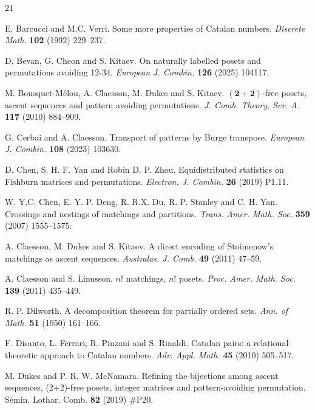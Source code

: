\documentclass[11pt]{article}
\begin{document}
	\begin{thebibliography}{21} 
		
		 E. Barcucci and M.C. Verri. Some more properties of Catalan numbers. \textit{Discrete Math}. {\bf 102} (1992) 229--237. 
		
		
		  D. Bevan, G. Cheon and S. Kitaev. 
		On naturally labelled posets and permutations avoiding 12-34. 
		\textit{European J. Combin.} {\bf 126} (2025) 104117.
		
		
		 M. Bousquet-M\'elou, A. Claesson, M. Dukes and S. Kitaev. $\mathbf{(2+2)}$-free posets, ascent sequences and pattern avoiding permutations. \textit{J. Comb. Theory, Ser. A.} {\bf 117} (2010) 884--909.
		
		 G. Cerbai and A. Claesson. Transport of patterns by Burge transpose. \textit{European J. Combin.} {\bf 108} (2023) 103630.
		
		 D. Chen, S. H. F. Yan and Robin D. P. Zhou. Equidistributed statistics on Fishburn matrices and permutations. {\it Electron. J. Combin.} {\bf 26} (2019) P1.11.
		
		 W. Y.C. Chen, E. Y. P. Deng, R. R.X. Du, R. P. Stanley and C. H. Yan. Crossings and nestings of matchings and partitions. \textit{Trans. Amer. Math. Soc.} {\bf 359 } (2007) 1555--1575.
		
		 A. Claesson, M. Dukes and S. Kitaev. A direct encoding of Stoimenow’s matchings as ascent sequences. \textit{Australas. J. Comb.}  {\bf 49} (2011) 47--59.
		
		 A. Claesson and S. Linusson. $n!$ matchings, $n!$ posets. \textit{Proc. Amer. Math. Soc.} {\bf 139} (2011) 435--449.
		
	
		 R. P. Dilworth. A decomposition theorem for partially ordered sets. {\it Ann. of Math.}  {\bf 51} (1950) 161--166.
		
		 F. Disanto, L. Ferrari, R. Pinzani and S. Rinaldi. Catalan pairs: a relational-theoretic approach to Catalan numbers. {\it Adv. Appl. Math.} {\bf 45} (2010) 505--517.
		
		 M. Dukes and P. R. W. McNamara. Refining the bijections among ascent sequences,
		(2+2)-free posets, integer matrices and
		pattern-avoiding permutation. {S{\'e}min. Lothar. Comb.}  {\bf 82} (2019) \#P20.
		

\end{thebibliography}
\end{document}
